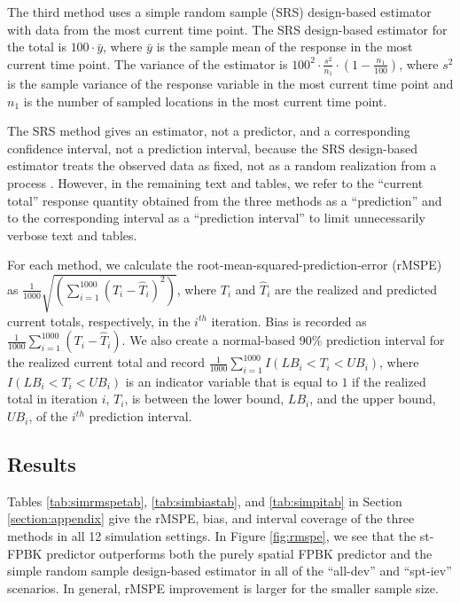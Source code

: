 \documentclass[]{interact}
\theoremstyle{plain}%
\theoremstyle{definition}
\theoremstyle{remark}
\begin{document}
The third method uses a simple random sample (SRS) design-based
estimator with data from the most current time point. The SRS
design-based estimator for the total is \(100 \cdot \bar{y}\), where
\(\bar{y}\) is the sample mean of the response in the most current time
point. The variance of the estimator \citep{lohr2021sampling} is
\(100^2 \cdot \frac{s^2}{n_1} \cdot (1 - \frac{n_1}{100})\), where
\(s^2\) is the sample variance of the response variable in the most
current time point and \(n_1\) is the number of sampled locations in the
most current time point.

The SRS method gives an estimator, not a predictor, and a corresponding
confidence interval, not a prediction interval, because the SRS
design-based estimator treats the observed data as fixed, not as a
random realization from a process
\citep{brus2021statistical, dumelle2022comparison}. However, in the
remaining text and tables, we refer to the ``current total'' response
quantity obtained from the three methods as a ``prediction'' and to the
corresponding interval as a ``prediction interval'' to limit
unnecessarily verbose text and tables.

For each method, we calculate the root-mean-squared-prediction-error
(rMSPE) as
\(\frac{1}{1000}\sqrt{(\sum_{i = 1}^{1000}(T_i - \hat{T}_i)^2)}\), where
\(T_i\) and \(\hat{T}_i\) are the realized and predicted current totals,
respectively, in the \(i^{th}\) iteration. Bias is recorded as
\(\frac{1}{1000}\sum_{i = 1}^{1000}(T_i - \hat{T}_i)\). We also create a
normal-based 90\% prediction interval for the realized current total and
record \(\frac{1}{1000} \sum_{i = 1}^{1000}I(LB_i < T_i < UB_i)\), where
\(I(LB_i < T_i < UB_i)\) is an indicator variable that is equal to \(1\)
if the realized total in iteration \(i\), \(T_i\), is between the lower
bound, \(LB_i\), and the upper bound, \(UB_i\), of the \(i^{th}\)
prediction interval.

\subsection{Results}

Tables \ref{tab:simrmspetab}, \ref{tab:simbiastab}, and
\ref{tab:simpitab} in Section \ref{section:appendix} give the rMSPE,
bias, and interval coverage of the three methods in all 12 simulation
settings. In Figure \ref{fig:rmspe}, we see that the st-FPBK predictor
outperforms both the purely spatial FPBK predictor and the simple random
sample design-based estimator in all of the ``all-dev'' and ``spt-iev''
scenarios. In general, rMSPE improvement is larger for the smaller
sample size.
\end{document}
